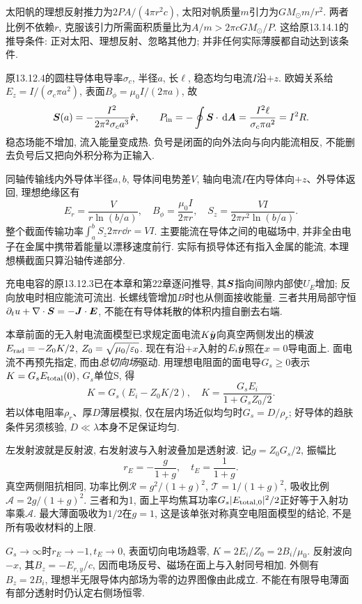太阳帆的理想反射推力为$2PA/(4\pi r^2c)$, 太阳对帆质量$m$引力为$GM_\odot m/r^2$. 两者比例不依赖$r$, 克服该引力所需面积质量比为$A/m>2\pi cGM_\odot/P$. 这给原13.14.1的推导条件: 正对太阳、理想反射、忽略其他力; 并非任何实际薄膜都自动达到该条件.

\label{tb:coax-poynting}
原13.12.4的圆柱导体电导率$\sigma_c$, 半径$a$, 长$\ell$, 稳态均匀电流$I$沿$+z$. 欧姆关系给$E_z=I/(\sigma_c\pi a^2)$, 表面$B_\phi=\mu_0I/(2\pi a)$, 故
\[\boldsymbol{S}(a)=-\frac{I^2}{2\pi^2\sigma_ca^3}\hat{\boldsymbol{r}},\qquad
P_{\rm in}=-\oint\boldsymbol{S}\cdot\,\mathrm d\boldsymbol{A}=\frac{I^2\ell}{\sigma_c\pi a^2}=I^2R.\]
稳态场能不增加, 流入能量变成热. 负号是闭面的向外法向与向内能流相反, 不能删去负号后又把向外积分称为正输入.

同轴传输线内外导体半径$a,b$, 导体间电势差$V$, 轴向电流$I$在内导体向$+z$、外导体返回, 理想绝缘区有
\[E_r=\frac{V}{r\ln(b/a)},\quad B_\phi=\frac{\mu_0I}{2\pi r},\quad
S_z=\frac{VI}{2\pi r^2\ln(b/a)}.\]
整个截面传输功率$\int_a^bS_z2\pi r\dd r=VI$. 主要能流在导体之间的电磁场中, 并非全由电子在金属中携带着能量以漂移速度前行. 实际有损导体还有指入金属的能流, 本理想横截面只算沿轴传递部分.

充电电容的原13.12.3已在本章和第22章逐问推导, 其$\boldsymbol{S}$指向间隙内部使$U_E$增加; 反向放电时相应能流可流出. 长螺线管增加$B$时也从侧面接收能量. 三者共用局部守恒$\partial_tu+\nabla\cdot\boldsymbol{S}=-\boldsymbol{J}\cdot\boldsymbol{E}$, 不能在有导体耗散的体积内擅自删去右端.

\label{tb:reflection}
本章前面的无入射电流面模型已求规定面电流$K\hat{\boldsymbol{y}}$向真空两侧发出的横波$E_{\rm rad}=-Z_0K/2$, $Z_0=\sqrt{\mu_0/\varepsilon_0}$. 现在有沿$+x$入射的$E_i\hat{\boldsymbol{y}}$照在$x=0$导电面上. 面电流不再预先指定, 而由\emph{总切向场}驱动. 用理想电阻面的面电导$G_s\ge0$表示$K=G_sE_{\rm total}(0)$, $G_s$单位S, 得
\[K=G_s(E_i-Z_0K/2),\quad
K=\frac{G_sE_i}{1+G_sZ_0/2}.\]
若以体电阻率$\rho_r$、厚$D$薄层模拟, 仅在层内场近似均匀时$G_s=D/\rho_r$; 好导体的趋肤条件另须核验, $D\ll\lambda$本身不足保证均匀.

左发射波就是反射波, 右发射波与入射波叠加是透射波. 记$g=Z_0G_s/2$, 振幅比
\[r_E=-\frac g{1+g},\quad t_E=\frac1{1+g}.\]
真空两侧阻抗相同, 功率比例$\mathcal R=g^2/(1+g)^2$, $\mathcal T=1/(1+g)^2$, 吸收比例$\mathcal A=2g/(1+g)^2$. 三者和为1, 面上平均焦耳功率$G_s|E_{\rm total,0}|^2/2$正好等于入射功率乘$\mathcal A$. 最大薄面吸收为$1/2$在$g=1$, 这是该单张对称真空电阻面模型的结论, 不是所有吸收材料的上限.

$G_s\to\infty$时$r_E\to-1,t_E\to0$, 表面切向电场趋零, $K=2E_i/Z_0=2B_i/\mu_0$. 反射波向$-x$, 其$B_z=-E_{r,y}/c$, 因而电场反号、磁场在面上与入射同号相加. 外侧有$B_z=2B_i$, 理想半无限导体内部场为零的边界图像由此成立. 不能在有限导电薄面有部分透射时仍认定右侧场恒零.

